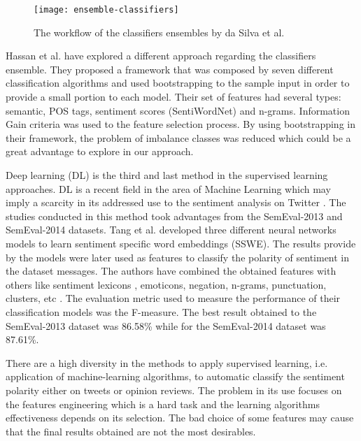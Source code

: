 \begin{figure}
  \caption{The workflow of the classifiers ensembles by da Silva et al. \cite{kn:daSilva2014}}
  \centering
    \texttt{[image: ensemble-classifiers]}
    \label{fig:ensemble-classifiers}
\end{figure}

Hassan et al. \cite{kn:Hassan2013} have explored a different approach regarding the classifiers ensemble. They proposed a framework that was composed by seven different classification algorithms and used bootstrapping to the sample input in order to provide a small portion to each model. Their set of features had several types: semantic, POS tags, sentiment scores (SentiWordNet) and n-grams. Information Gain criteria was used to the feature selection process. By using bootstrapping in their framework, the problem of imbalance classes was reduced which could be a great advantage to explore in our approach.

Deep learning (DL) is the third and last method in the supervised learning approaches. DL is a recent field in the area of Machine Learning which may imply a scarcity in its addressed use to the sentiment analysis on Twitter \cite{kn:Giachanou2016}.
The studies conducted in this method took advantages from the SemEval-2013 and SemEval-2014 datasets. Tang et al. \cite{kn:tang2014learning} developed three different neural networks models to learn sentiment specific word embeddings (SSWE). The results provide by the models were later used as features to classify the polarity of sentiment in the dataset messages. The authors have combined the obtained features with others like sentiment lexicons \cite{kn:tang2014learning}, emoticons, negation, n-grams, punctuation, clusters, etc \cite{kn:tang2014coooolll}. The evaluation metric used to measure the performance of their classification models was the F-measure. The best result obtained to the SemEval-2013 dataset was 86.58\% while for the SemEval-2014 dataset was 87.61\%.

There are a high diversity in the methods to apply supervised learning, i.e. application of machine-learning algorithms, to automatic classify the sentiment polarity either on tweets or opinion reviews. The problem in its use focuses on the features engineering which is a hard task and the learning algorithms effectiveness depends on its selection. The bad choice of some features may cause that the final results obtained are not the most desirables.

